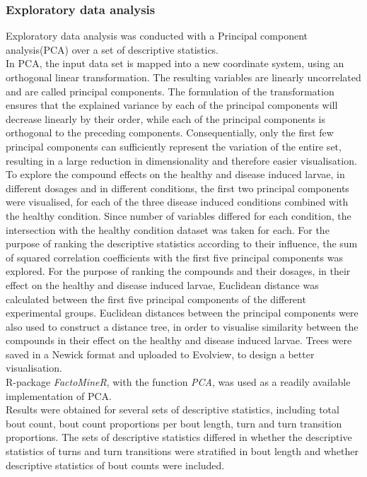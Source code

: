 \documentclass[a4paper,12pt]{article}
\begin{document}
\subsubsection{Exploratory data analysis}
Exploratory data analysis was conducted with a Principal component analysis(PCA)\cite{ref35} over a set of descriptive statistics. \\In PCA, the input data set is mapped into a new coordinate system, using an orthogonal linear transformation. The resulting variables are linearly uncorrelated and are called principal components. The formulation of the transformation ensures that the explained variance by each of the principal components will decrease linearly by their order, while each of the principal components is orthogonal to the preceding components. Consequentially, only the first few principal components can sufficiently represent the variation of the entire set, resulting in a large reduction in dimensionality and therefore easier visualisation. \\To explore the compound effects on the healthy and disease induced larvae, in different dosages and in different conditions, the first two principal components were visualised, for each of the three disease induced conditions combined with the healthy condition. Since number of variables differed for each condition, the intersection with the healthy condition dataset was taken for each. For the purpose of ranking the descriptive statistics according to their influence, the sum of squared correlation coefficients with the first five principal components was explored. For the purpose of ranking the compounds and their dosages, in their effect on the healthy and disease induced larvae, Euclidean distance was calculated between the first five principal components of the different experimental groups. Euclidean distances between the principal components were also used to construct a distance tree, in order to  visualise similarity between the compounds in their effect on the healthy and disease induced larvae. Trees were saved in a Newick format and uploaded to Evolview\cite{ref37}, to design a better visualisation.
\\R-package \textit{FactoMineR}\cite{ref36}, with the function \textit{PCA}, was used as a readily available implementation of PCA.
\\Results were obtained for several sets of descriptive statistics, including total bout count, bout count proportions per bout length, turn and turn transition proportions. The sets of descriptive statistics differed in whether the descriptive statistics of turns and turn transitions were stratified in bout length and whether descriptive statistics of bout counts were included. 
\end{document}
